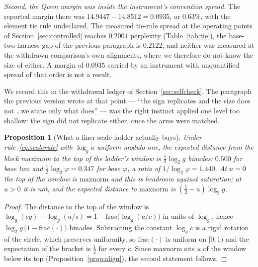\documentclass[11pt]{article}
\newtheorem{proposition}[theorem]{Proposition}
\theoremstyle{definition}
\begin{document}
\emph{Second, the Qwen margin was inside the instrument's convention spread.}
The reported margin there was $14.9447 - 14.8512 = 0.0935$, or $0.63\%$, with
the element tie rule undeclared. The measured tie-rule spread at the operating
points of Section~\ref{sec:controlled} reaches $0.2001$ perplexity
(Table~\ref{tab:tie}), the base-two harness gap of the previous paragraph is
$0.2122$, and neither was measured at the withdrawn comparison's own alignments,
where we therefore do not know the size of either. A margin of $0.0935$ carried
by an instrument with unquantified spread of that order is not a result.%

We record this in the withdrawal ledger of Section~\ref{sec:selfcheck}. The
paragraph the previous version wrote at that point --- ``the sign replicates and
the size does not \ldots we state only what does'' --- was the right instinct
applied one level too shallow: the sign did not replicate either, once the arms
were matched.

\begin{proposition}[What a finer scale ladder actually buys]
\label{prop:headroom}
Under rule~\eqref{eq:scalerule} with $\log_g a$ uniform modulo one, the expected
distance from the block maximum to the top of the ladder's window is
$\tfrac12\log_2 g$ binades: $0.500$ for base two and
$\tfrac12\log_2\varphi = 0.347$ for base $\varphi$, a ratio of
$1/\log_2\varphi = 1.440$. At $u=0$ the top of the window is
$\mathrm{maxnorm}$ and this is headroom against saturation; at $u>0$ it is not,
and the expected distance to $\mathrm{maxnorm}$ is $(\tfrac12-u)\log_2 g$.
\end{proposition}

\begin{proof}
The distance to the top of the window is
$\log_g(cg)-\log_g(a/s) = 1-\mathrm{frac}\bigl(\log_g(a/c)\bigr)$ in units of
$\log_g$, hence $\log_2 g\,\bigl(1-\mathrm{frac}(\cdot)\bigr)$ binades.
Subtracting the constant $\log_g c$ is a rigid rotation of the circle, which
preserves uniformity, so $\mathrm{frac}(\cdot)$ is uniform on $[0,1)$ and the
expectation of the bracket is $\tfrac12$ for every $c$. Since
$\mathrm{maxnorm}$ sits $u$ of the window below its top
(Proposition~\ref{prop:align}), the second statement follows.
\end{proof}
\end{document}
